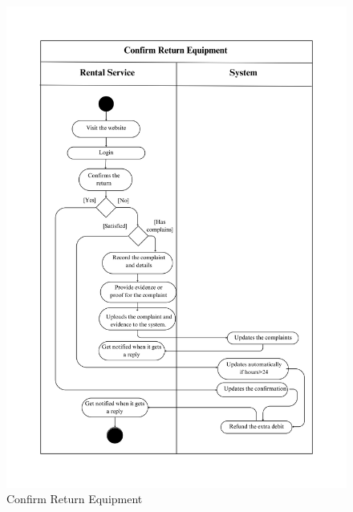 \begin{figure}[h!]
    \centering
    \includegraphics[width=1\textwidth]{Images/Activity Diagrams/35 Confirm Return Equipment.png}
    \caption{Confirm Return Equipment}
    \label{fig:activity-confirm-return}
\end{figure}


